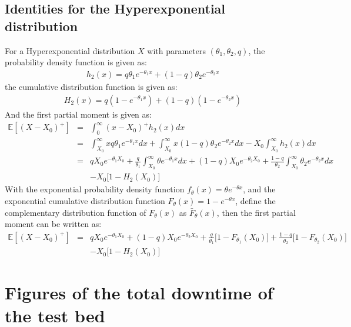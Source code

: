 \documentclass[preprint,12pt]{elsarticle}
\begin{document}
\begin{appendices}
\subsection{Identities for the Hyperexponential distribution}
For a Hyperexponential distribution $X$ with parameters $(\theta_1,\theta_2,q)$, the probability density function is given as:
\begin{eqnarray}
h_{2}(x) = q\theta_{1}e^{-\theta_{1}x} + (1-q)\theta_{2}e^{-\theta_{2}x} \nonumber
\end{eqnarray}
the cumulative distribution function is given as:
\begin{eqnarray}
H_{2}(x) = q(1-e^{-\theta_{1}x})+(1-q)(1-e^{-\theta_{2}x}) \nonumber
\end{eqnarray}
And the first partial moment is given as:
\begin{eqnarray}
\mathbb{E}{[(X-X_{0})^{+}]} &=& \int^{\infty}_{0}(x-X_{0})^{+}h_{2}(x)dx \nonumber\\
&=& \int^{\infty}_{X_{0}}{xq\theta_{1}e^{-\theta_{1}x}dx} + \int^{\infty}_{X_{0}}{x(1-q)\theta_{2}e^{-\theta_{2}x}dx}-X_{0}\int_{X_{0}}^{\infty}{h_{2}(x)dx} \nonumber\\
&=& qX_{0}e^{-\theta_{1}X_{0}} + \frac{q}{\theta_{1}}\int_{X_{0}}^{\infty}{\theta e^{-\theta_{1} x}dx} + (1-q)X_{0}e^{-\theta_{2}X_{0}} + \frac{1-q}{\theta_{2}}\int_{X_{0}}^{\infty}{\theta_{2}e^{-\theta_{2}x}dx} \nonumber\\
&& -X_{0}\bigg[1-H_{2}(X_{0}) \bigg] \nonumber
\end{eqnarray}
With the exponential probability density function $f_{\theta}(x)=\theta e^{-\theta x}$, and the exponential cumulative distribution function $F_{\theta}(x)= 1-e^{-\theta x}$, define the complementary distribution function of $F_{\theta}(x)$ as $\bar{F}_{\theta}(x)$, then the first partial moment can be written as:
\begin{eqnarray}
\mathbb{E}{[(X-X_{0})^{+}]}&=& qX_{0}e^{-\theta_{1}X_{0}} + (1-q)X_{0}e^{-\theta_{2}X_{0}} + \frac{q}{\theta_{1}}\bigg[1-F_{\theta_{1}}(X_{0})\bigg]+\frac{1-q}{\theta_{2}}\bigg[1-F_{\theta_{2}}(X_{0}) \bigg] \nonumber\\
&&-X_{0}\bigg[ 1- H_{2}(X_{0})\bigg] \nonumber
\end{eqnarray}


\section{Figures of the total downtime of the test bed}


\end{appendices}
\end{document}
